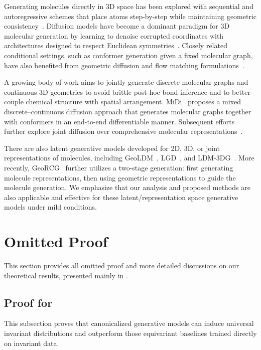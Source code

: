\documentclass{article}
\theoremstyle{plain}
\theoremstyle{definition}
\theoremstyle{remark}
\newcommand{\1}{\mathbf{1}}
\begin{document}
Generating molecules directly in 3D space has been explored with sequential and autoregressive schemes that place atoms step-by-step while maintaining geometric consistency~\citep{gebauer2019symmetry, luo2022autoregressive,feng2023generation3dmoleculespockets,doi:10.26434/chemrxiv-2024-0ckgt-v2}. Diffusion models have become a dominant paradigm for 3D molecular generation by learning to denoise corrupted coordinates with architectures designed to respect Euclidean symmetries~\citep{hoogeboom2022equivariant}. Closely related conditional settings, such as conformer generation given a fixed molecular graph, have also benefited from geometric diffusion and flow matching formulations~\citep{xu2022geodiff,hassan2024etflowequivariantflowmatchingmolecular,hong2025accelerating3dmoleculegeneration, wu2022diffusion}. 

A growing body of work aims to jointly generate discrete molecular graphs and continuous 3D geometries to avoid brittle post-hoc bond inference and to better couple chemical structure with spatial arrangement. MiDi~\citep{vignac2023midi} proposes a mixed discrete--continuous diffusion approach that generates molecular graphs together with conformers in an end-to-end differentiable manner. Subsequent efforts further explore joint diffusion over comprehensive molecular representations~\citep{huang2023learningjoint2d,hua2024mudiffunifieddiffusioncomplete,irwin2024semlaflow}.

There are also latent generative models developed for 2D, 3D, or joint representations of molecules, including GeoLDM~\citep{xu2023geometric}, LGD~\citep{latentgraphdiffusion}, and LDM-3DG~\citep{you2023latent}. More recently, GeoRCG~\citep{li2024geometric} further utilizes a two-stage generation: first generating molecule representations, then using geometric representations to guide the molecule generation. We emphasize that our analysis and proposed methods are also applicable and effective for these latent/representation space generative models under mild conditions.

\section{Omitted Proof}\label{sec_appendix:proof}

This section provides all omitted proof and more detailed discussions on our theoretical results, presented mainly in .

\subsection{Proof for }\label{subsec_appendix:proof_correct}
This subsection proves that canonicalized generative models can induce universal invariant distributions and outperform those equivariant baselines trained directly on invariant data.
\end{document}
